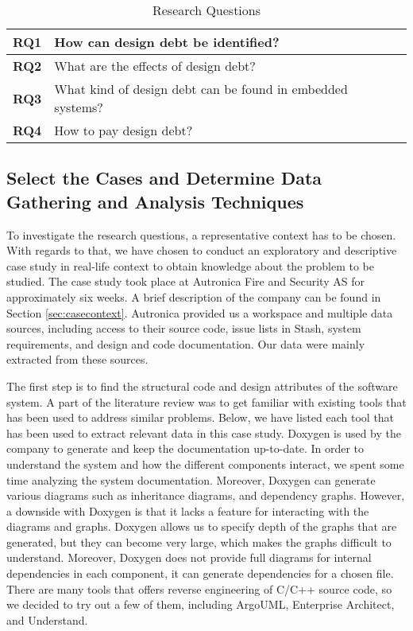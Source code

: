 \begin{table}[]
	\centering
	\caption{Research Questions}
	\label{researchQuestionsChapter3}
	\begin{tabular}{|l|p{8cm}|}
		\hline
		\textbf{RQ1} & How can design debt be identified?     \\ \hline
		\textbf{RQ2} & What are the effects of design debt?  \\ \hline
		\textbf{RQ3} & What kind of design debt can be found in embedded systems? \\ \hline
		\textbf{RQ4} & How to pay design debt? \\ \hline
	\end{tabular}
\end{table}



\subsection{Select the Cases and Determine Data Gathering and Analysis Techniques} %
To investigate the research questions, a representative context has to be chosen. With regards to that, we have chosen to conduct an exploratory and descriptive case study in real-life context to obtain knowledge about the problem to be studied. The case study took place at Autronica Fire and Security AS for approximately six weeks. A brief description of the company can be found in Section \ref{sec:casecontext}. Autronica provided us a workspace and multiple data sources, including access to their source code, issue lists in Stash, system requirements, and design and code documentation. Our data were mainly extracted from these sources.

The first step is to find the structural code and design attributes of the software system. A part of the literature review was to get familiar with existing tools that has been used to address similar problems. Below, we have listed each tool that has been used to extract relevant data in this case study. Doxygen is used by the company to generate and keep the documentation up-to-date. In order to understand the system and how the different components interact, we spent some time analyzing the system documentation. Moreover, Doxygen can generate various diagrams such as inheritance diagrams, and dependency graphs. However, a downside with Doxygen is that it lacks a feature for interacting with the diagrams and graphs. Doxygen allows us to specify depth of the graphs that are generated, but they can become very large, which makes the graphs difficult to understand. Moreover, Doxygen does not provide full diagrams for internal dependencies in each component, it can generate dependencies for a chosen file. There are many tools that offers reverse engineering of C/C++ source code, so we decided to try out a few of them, including ArgoUML, Enterprise Architect, and Understand. 

